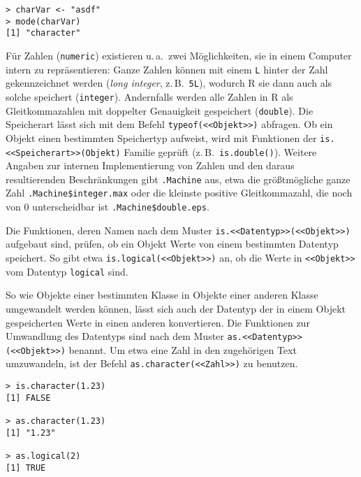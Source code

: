 \begin{lstlisting}
> charVar <- "asdf"
> mode(charVar)
[1] "character"
\end{lstlisting}

Für Zahlen (\lstinline!numeric!) existieren u.\,a.\ zwei Möglichkeiten, sie in einem Computer intern zu repräsentieren: Ganze Zahlen können mit einem \lstinline!L! hinter der Zahl gekennzeichnet werden (\emph{long integer}, z.\,B.\ \lstinline!5L!), wodurch R sie dann auch als solche speichert (\lstinline!integer!). Andernfalls werden alle Zahlen in R als Gleitkommazahlen mit doppelter Genauigkeit gespeichert (\lstinline!double!). Die Speicherart lässt sich mit dem Befehl \lstinline!typeof(<<Objekt>>)! abfragen. Ob ein Objekt einen bestimmten Speichertyp aufweist, wird mit Funktionen der \lstinline!is.<<Speicherart>>(Objekt)! Familie geprüft (z.\,B.\ \lstinline!is.double()!). Weitere Angaben zur internen Implementierung von Zahlen und den daraus resultierenden Beschränkungen gibt \lstinline!.Machine! aus, etwa die größtmögliche ganze Zahl \lstinline!.Machine$integer.max! oder die kleinste positive Gleitkommazahl, die noch von $0$ unterscheidbar ist \lstinline!.Machine$double.eps!.

Die Funktionen, deren Namen nach dem Muster \lstinline!is.<<Datentyp>>(<<Objekt>>)! aufgebaut sind, prüfen, ob ein Objekt Werte von einem bestimmten Datentyp speichert. So gibt etwa \lstinline!is.logical(<<Objekt>>)! an, ob die Werte in \lstinline!<<Objekt>>! vom Datentyp \lstinline!logical! sind.

So wie Objekte einer bestimmten Klasse in Objekte einer anderen Klasse umgewandelt werden können, lässt sich auch der Datentyp der in einem Objekt gespeicherten Werte in einen anderen konvertieren. Die Funktionen zur Umwandlung des Datentyps sind nach dem Muster \lstinline!as.<<Datentyp>>(<<Objekt>>)! benannt. Um etwa eine Zahl in den zugehörigen Text umzuwandeln, ist der Befehl \lstinline!as.character(<<Zahl>>)! zu benutzen.
\begin{lstlisting}
> is.character(1.23)
[1] FALSE

> as.character(1.23)
[1] "1.23"

> as.logical(2)
[1] TRUE
\end{lstlisting}

